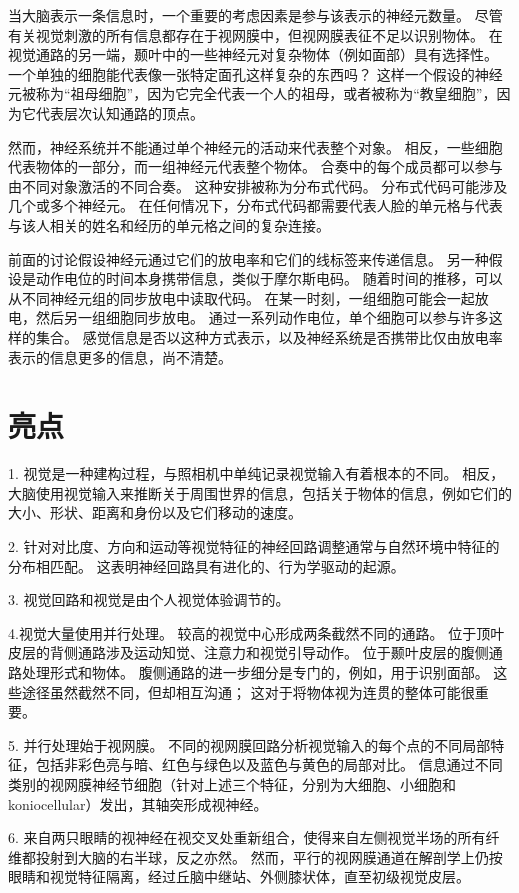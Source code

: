 当大脑表示一条信息时，一个重要的考虑因素是参与该表示的神经元数量。
尽管有关视觉刺激的所有信息都存在于视网膜中，但视网膜表征不足以识别物体。
在视觉通路的另一端，颞叶中的一些神经元对复杂物体（例如面部）具有选择性。
一个单独的细胞能代表像一张特定面孔这样复杂的东西吗？
这样一个假设的神经元被称为“祖母细胞”，因为它完全代表一个人的祖母，或者被称为“教皇细胞”，因为它代表层次认知通路的顶点。


然而，神经系统并不能通过单个神经元的活动来代表整个对象。
相反，一些细胞代表物体的一部分，而一组神经元代表整个物体。
合奏中的每个成员都可以参与由不同对象激活的不同合奏。
这种安排被称为分布式代码。 分布式代码可能涉及几个或多个神经元。
在任何情况下，分布式代码都需要代表人脸的单元格与代表与该人相关的姓名和经历的单元格之间的复杂连接。


前面的讨论假设神经元通过它们的放电率和它们的线标签来传递信息。
另一种假设是动作电位的时间本身携带信息，类似于摩尔斯电码。
随着时间的推移，可以从不同神经元组的同步放电中读取代码。
在某一时刻，一组细胞可能会一起放电，然后另一组细胞同步放电。
通过一系列动作电位，单个细胞可以参与许多这样的集合。
感觉信息是否以这种方式表示，以及神经系统是否携带比仅由放电率表示的信息更多的信息，尚不清楚。



\section{亮点}

1. 视觉是一种建构过程，与照相机中单纯记录视觉输入有着根本的不同。
相反，大脑使用视觉输入来推断关于周围世界的信息，包括关于物体的信息，例如它们的大小、形状、距离和身份以及它们移动的速度。


2. 针对对比度、方向和运动等视觉特征的神经回路调整通常与自然环境中特征的分布相匹配。
这表明神经回路具有进化的、行为学驱动的起源。


3. 视觉回路和视觉是由个人视觉体验调节的。


4.视觉大量使用并行处理。
较高的视觉中心形成两条截然不同的通路。
位于顶叶皮层的背侧通路涉及运动知觉、注意力和视觉引导动作。
位于颞叶皮层的腹侧通路处理形式和物体。
腹侧通路的进一步细分是专门的，例如，用于识别面部。 
这些途径虽然截然不同，但却相互沟通；
这对于将物体视为连贯的整体可能很重要。
 

5. 并行处理始于视网膜。
不同的视网膜回路分析视觉输入的每个点的不同局部特征，包括非彩色亮与暗、红色与绿色以及蓝色与黄色的局部对比。
信息通过不同类别的视网膜神经节细胞（针对上述三个特征，分别为大细胞、小细胞和 koniocellular）发出，其轴突形成视神经。
 

6. 来自两只眼睛的视神经在视交叉处重新组合，使得来自左侧视觉半场的所有纤维都投射到大脑的右半球，反之亦然。
然而，平行的视网膜通道在解剖学上仍按眼睛和视觉特征隔离，经过丘脑中继站、外侧膝状体，直至初级视觉皮层。 


